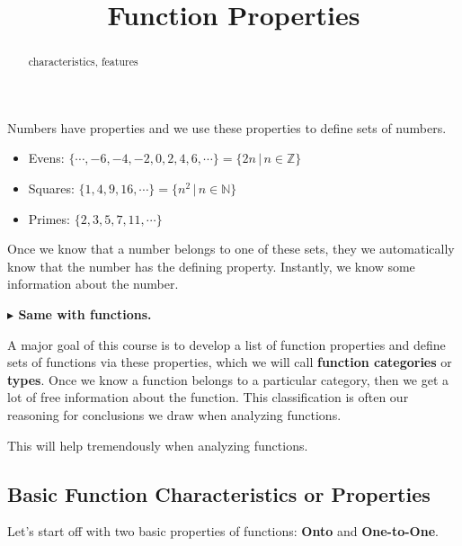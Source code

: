 \documentclass{ximera}
\title{Function Properties}
\begin{document}
\begin{abstract}
characteristics, features
\end{abstract}
\maketitle





Numbers have properties and we use these properties to define sets of numbers. 



\begin{itemize}
\item Evens:  $\{ \cdots, -6, -4, -2, 0, 2, 4, 6, \cdots \} = \{ 2n   \, | \, n \in \mathbb{Z} \}$
\item Squares:  $\{ 1, 4, 9, 16, \cdots \} = \{ n^2   \, | \, n \in \mathbb{N} \}$
\item Primes:  $\{ 2, 3, 5, 7, 11,  \cdots \}$
\end{itemize}

Once we know that a number belongs to one of these sets, they we automatically know that the number has the defining property. Instantly, we know some information about the number. 


\textbf{\textcolor{red!70!black}{$\blacktriangleright$ Same with functions.}}


A major goal of this course is to develop a list of function properties and define sets of functions via these properties, which we will call \textbf{function categories} or \textbf{types}.  Once we know a function belongs to a particular category, then we get a lot of free information about the function. This classification is often our reasoning for conclusions we draw when analyzing functions. 


This will help tremendously when analyzing functions.







\subsection*{Basic Function Characteristics or Properties}


Let's start off with two basic properties of functions: \textbf{Onto} and \textbf{One-to-One}.
\end{document}

